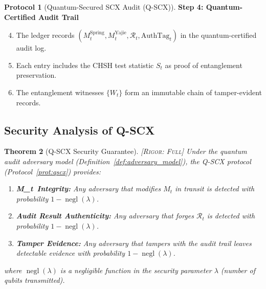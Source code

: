 \documentclass[11pt,a4paper]{article}
\theoremstyle{plain}
\newtheorem{theorem}{Theorem}[section]
\theoremstyle{definition}
\newtheorem{protocol}[theorem]{Protocol}
\theoremstyle{remark}
\DeclareMathOperator{\negl}{negl}
\newcommand{\Mt}{M_t}
\newcommand{\AuditResult}{\mathcal{R}}
\newcommand{\rigorFull}{\textsc{[Rigor: Full]}}
\begin{document}
\begin{protocol}[Quantum-Secured SCX Audit (Q-SCX)]
\medskip
\noindent\textbf{Step 4: Quantum-Certified Audit Trail}

\begin{enumerate}[label=4.\arabic*]
  \setcounter{enumi}{3}
  \item The ledger records $(\Mt^{\text{Spring}}, \Mt^{\text{Yajie}},
        \AuditResult_t, \text{AuthTag}_t)$ in the quantum-certified audit log.
  \item Each entry includes the CHSH test statistic $S_t$ as proof of
        entanglement preservation.
  \item The entanglement witnesses $\{W_t\}$ form an immutable chain of
        tamper-evident records.
\end{enumerate}
\end{protocol}

\subsection{Security Analysis of Q-SCX}
\label{sec:integration_security}

\begin{theorem}[Q-SCX Security Guarantee]
\label{thm:qscx_security}
\rigorFull
Under the quantum audit adversary model (Definition~\ref{def:adversary_model}),
the Q-SCX protocol (Protocol~\ref{prot:qscx}) provides:
\begin{enumerate}[label=(\roman*)]
  \item \textbf{\Mt\ Integrity:} Any adversary that modifies $\Mt$ in transit
        is detected with probability $1 - \negl(\lambda)$.
  \item \textbf{Audit Result Authenticity:} Any adversary that forges
        $\AuditResult_t$ is detected with probability $1 - \negl(\lambda)$.
  \item \textbf{Tamper Evidence:} Any adversary that tampers with the audit
        trail leaves detectable evidence with probability $1 - \negl(\lambda)$.
\end{enumerate}
where $\negl(\lambda)$ is a negligible function in the security parameter
$\lambda$ (number of qubits transmitted).
\end{theorem}
\end{document}
